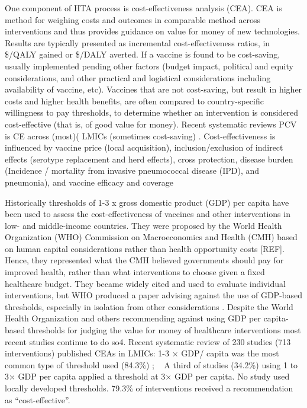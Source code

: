 \documentclass[12pt]{article}
\begin{document}
One component of HTA process is cost-effectiveness analysis (CEA). CEA is method for weighing costs and outcomes in comparable method across interventions and thus provides guidance on value for money of new technologies. Results are typically presented as incremental cost-effectiveness ratios, in \$/QALY gained or \$/DALY averted. If a vaccine is found to be cost-saving, usually implemented pending other factors (budget impact, political and equity considerations, and other practical and logistical considerations including availability of vaccine, etc). Vaccines that are not cost-saving, but result in higher costs and higher health benefits, are often compared to country-specific willingness to pay thresholds, to determine whether an intervention is considered cost-effective (that is, of good value for money). Recent systematic reviews PCV is CE across (most)( LMICs (sometimes cost-saving) \supercite{saokaew_cost_2016, syeed_pneumococcal_2023, wang_systematic_2022, zakiyah_pneumococcal_2020}. Cost-effectiveness is influenced by vaccine price (local acquisition), inclusion/exclusion of indirect effects (serotype replacement and herd effects), cross protection, disease burden (Incidence / mortality from invasive pneumococcal disease (IPD), and pneumonia), and vaccine efficacy and coverage

Historically thresholds of 1-3 x gross domestic product (GDP) per capita have been used to assess the cost-effectiveness of vaccines and other interventions in low- and middle-income countries. They were proposed by the World Health Organization (WHO) Commission on Macroeconomics and Health (CMH) based on human capital considerations rather than health opportunity costs [REF]. Hence, they represented what the CMH believed governments should pay for improved health, rather than what interventions to choose given a fixed healthcare budget. They became widely cited and used to evaluate individual interventions, but WHO produced a paper advising against the use of GDP-based thresholds, especially in isolation from other considerations \parencite{bertram_costeffectiveness_2016}. Despite the World Health Organization and others recommending against using GDP per capita-based thresholds for judging the value for money of healthcare interventions most recent studies continue to do so4. Recent systematic review of 230 studies (713 interventions) published CEAs in LMICs: 1-3 × GDP/ capita was the most common type of threshold used (84.3\%) ; ~ A third of studies (34.2\%) using 1 to 3× GDP per capita applied a threshold at 3× GDP per capita. No study used locally developed thresholds. 79.3\% of interventions received a recommendation as “cost-effective”.
\end{document}
